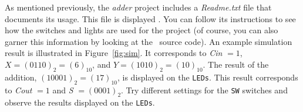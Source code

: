 {As mentioned previously, the {\it adder} project includes a {\it Readme.txt} file that
documents its usage. This file is displayed \fi. You can follow
its instructions to see how the switches and lights are used for the project (of course, 
you can also garner this information by looking at the \hdlName~source code). An example
simulation result is illustrated in Figure~\ref{fig:sim}. It corresponds to {\it Cin} $= 1$,
$X = (0110)_2 = (6)_{10}$, and $Y = (1010)_2 = (10)_{10}$. The result of the addition,
$(10001)_2 = (17)_{10}$, is displayed on the \texttt{LEDs}. This result corresponds
to {\it Cout} $= 1$ and {\it S} $= (0001)_2$.  Try different settings for the
\texttt{SW} switches and observe the results displayed on the \texttt{LEDs}.

\begin{figure}[h]
	\begin{center}
        \setlength{\fboxsep}{0pt}
        \ifverilog
            \ifnotSV
            \else

\end{center}
\end{figure}}
